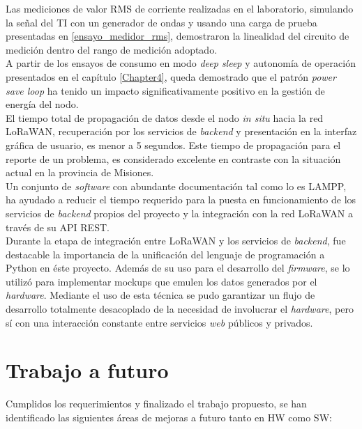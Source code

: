 Las mediciones de valor RMS de corriente realizadas en el laboratorio, simulando la señal del TI con un generador de ondas y usando una carga de prueba presentadas en \ref{ensayo_medidor_rms}, demostraron la linealidad del circuito de medición dentro del rango de medición adoptado.\\
A partir de los ensayos de consumo en modo \textit{deep sleep} y autonomía de operación presentados en el capítulo \ref{Chapter4}, queda demostrado que el patrón \textit{power save loop} ha tenido un impacto significativamente positivo en la gestión de energía del nodo.\\
El tiempo total de propagación de datos desde el nodo \textit{in situ} hacia la red LoRaWAN, recuperación por los servicios de \textit{backend} y presentación en la interfaz gr\'{a}fica de usuario, es menor a 5 segundos. Este tiempo de propagación para el reporte de un problema, es considerado excelente en contraste con la situación actual en la provincia de Misiones.\\
Un conjunto de \textit{software} con abundante documentación tal como lo es LAMPP, ha ayudado a reducir el tiempo requerido para la puesta en funcionamiento de los servicios de \textit{backend} propios del proyecto y la integración con la red LoRaWAN a través de su API REST.\\
Durante la etapa de integración entre LoRaWAN y los servicios de \textit{backend}, fue destacable la importancia de la unificación del lenguaje de programación a Python en \'{e}ste proyecto. Además de su uso para el desarrollo del \textit{firmware}, se lo utilizó para implementar mockups que emulen los datos generados por el \textit{hardware}. Mediante el uso de esta técnica se pudo garantizar un flujo de desarrollo totalmente desacoplado de la necesidad de involucrar el \textit{hardware}, pero sí con una interacción constante entre servicios \textit{web} públicos y privados.\\


\section{Trabajo a futuro}

Cumplidos los requerimientos y finalizado el trabajo propuesto, se han identificado las siguientes áreas de mejoras a futuro tanto en HW como SW:

